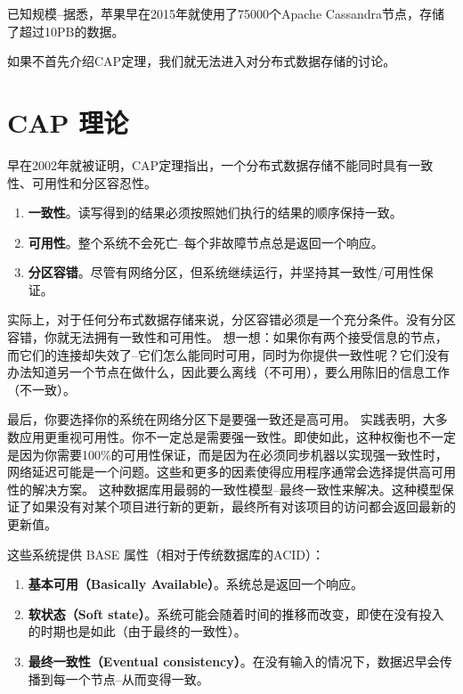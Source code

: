 \documentclass[degree=project,degree-type=project,cjk-font=noto]{thuthesis}
\begin{document}
已知规模--据悉，苹果早在2015年就使用了75000个Apache Cassandra节点，存储了超过10PB的数据。

如果不首先介绍CAP定理，我们就无法进入对分布式数据存储的讨论。

\section{CAP 理论}

早在2002年就被证明，CAP定理指出，一个分布式数据存储不能同时具有一致性、可用性和分区容忍性。

\begin{enumerate}
    \item \textbf{一致性}。读写得到的结果必须按照她们执行的结果的顺序保持一致。
    \item \textbf{可用性}。整个系统不会死亡--每个非故障节点总是返回一个响应。
    \item \textbf{分区容错}。尽管有网络分区，但系统继续运行，并坚持其一致性/可用性保证。
\end{enumerate}

实际上，对于任何分布式数据存储来说，分区容错必须是一个充分条件。没有分区容错，你就无法拥有一致性和可用性。
想一想：如果你有两个接受信息的节点，而它们的连接却失效了--它们怎么能同时可用，同时为你提供一致性呢？它们没有办法知道另一个节点在做什么，因此要么离线（不可用），要么用陈旧的信息工作（不一致）。

最后，你要选择你的系统在网络分区下是要强一致还是高可用。
实践表明，大多数应用更重视可用性。你不一定总是需要强一致性。即使如此，这种权衡也不一定是因为你需要100\%的可用性保证，而是因为在必须同步机器以实现强一致性时，网络延迟可能是一个问题。这些和更多的因素使得应用程序通常会选择提供高可用性的解决方案。
这种数据库用最弱的一致性模型--最终一致性来解决。这种模型保证了如果没有对某个项目进行新的更新，最终所有对该项目的访问都会返回最新的更新值。

这些系统提供 BASE 属性（相对于传统数据库的ACID）：

\begin{enumerate}
    \item \textbf{基本可用（Basically Available）}。系统总是返回一个响应。
    \item \textbf{软状态（Soft state）}。系统可能会随着时间的推移而改变，即使在没有投入的时期也是如此（由于最终的一致性）。
    \item \textbf{最终一致性（Eventual consistency）}。在没有输入的情况下，数据迟早会传播到每一个节点--从而变得一致。
\end{enumerate}
\end{document}
